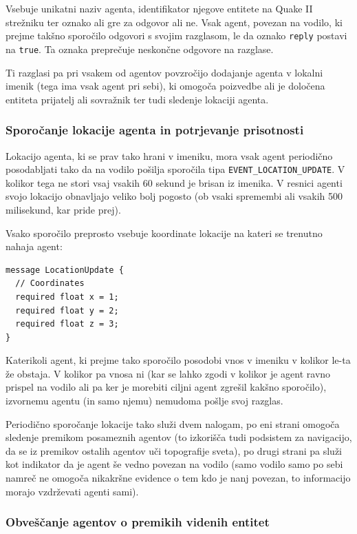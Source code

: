 \documentclass[a4paper,10pt]{article}
\begin{document}
\noindent
Vsebuje unikatni naziv agenta, identifikator njegove entitete na Quake II strežniku ter oznako ali gre za odgovor ali ne. Vsak agent, povezan na vodilo, ki prejme takšno sporočilo odgovori s svojim razglasom, le da oznako \texttt{reply} postavi na \texttt{true}. Ta oznaka preprečuje neskončne odgovore na razglase.

Ti razglasi pa pri vsakem od agentov povzročijo dodajanje agenta v lokalni imenik (tega ima vsak agent pri sebi), ki omogoča poizvedbe ali je določena entiteta prijatelj ali sovražnik ter tudi sledenje lokaciji agenta.

\subsubsection{Sporočanje lokacije agenta in potrjevanje prisotnosti}

Lokacijo agenta, ki se prav tako hrani v imeniku, mora vsak agent periodično posodabljati tako da na vodilo pošilja sporočila tipa \texttt{EVENT\_LOCATION\_UPDATE}. V kolikor tega ne stori vsaj vsakih 60 sekund je brisan iz imenika. V resnici agenti svojo lokacijo obnavljajo veliko bolj pogosto (ob vsaki spremembi ali vsakih 500 milisekund, kar pride prej).

Vsako sporočilo preprosto vsebuje koordinate lokacije na kateri se trenutno nahaja agent:
\begin{verbatim}
message LocationUpdate {
  // Coordinates
  required float x = 1;
  required float y = 2;
  required float z = 3;
}
\end{verbatim}

\noindent
Katerikoli agent, ki prejme tako sporočilo posodobi vnos v imeniku v kolikor le-ta že obstaja. V kolikor pa vnosa ni (kar se lahko zgodi v kolikor je agent ravno prispel na vodilo ali pa ker je morebiti ciljni agent zgrešil kakšno sporočilo), izvornemu agentu (in samo njemu) nemudoma pošlje svoj razglas.

Periodično sporočanje lokacije tako služi dvem nalogam, po eni strani omogoča sledenje premikom posameznih agentov (to izkorišča tudi podsistem za navigacijo, da se iz premikov ostalih agentov uči topografije sveta), po drugi strani pa služi kot indikator da je agent še vedno povezan na vodilo (samo vodilo samo po sebi namreč ne omogoča nikakršne evidence o tem kdo je nanj povezan, to informacijo morajo vzdrževati agenti sami).

\subsubsection{Obveščanje agentov o premikih videnih entitet}
\end{document}
